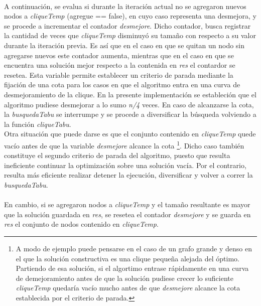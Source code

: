 \paragraph{}
A continuación, se evalua si durante la iteración actual no se agregaron nuevos nodos a \textit{cliqueTemp} (agregue == false), en cuyo caso representa una desmejora, y se procede a incrementar el contador \textit{desmejore}. Dicho contador, busca registrar la cantidad de veces que \textit{cliqueTemp} disminuyó su tamaño con respecto a su valor durante la iteración previa. Es así que en el caso en que se quitan un nodo sin agregarse nuevos este contador aumenta, mientras que en el caso en que se encuentra una solución mejor respecto a la contenida en \textit{res} el contardor se resetea. Esta variable permite establecer un criterio de parada mediante la fijación de una cota para los casos en que el algoritmo entra en una curva de desmejoramiento de la clique. En la presente implementación se estableción que el algoritmo pudiese desmejorar a lo sumo \textit{n/4} veces. En caso de alcanzarse la cota, la \textit{busquedaTabu} se interrumpe y se procede a diversificar la búsqueda volviendo a la función \textit{cliqueTabu}. \\
Otra situación que puede darse es que el conjunto contenido en \textit{cliqueTemp} quede vacío antes de que la variable \textit{desmejore} alcance la cota \footnote{A modo de ejemplo puede pensarse en el caso de un grafo grande y denso en el que la solución constructiva es una clique pequeña alejada del óptimo. Partiendo de esa solución, si el algortimo entrase rápidamente en una curva de demejoramiento antes de que la solución pudiese crecer lo suficiente \textit{cliqueTemp} quedaría vacío mucho antes de que \textit{desmejore} alcance la cota establecida por el criterio de parada.}. Dicho caso también constituye el segundo criterio de parada del algoritmo, puesto que resulta ineficiente continuar la optimización sobre una solución vacía. Por el contrario, resulta más eficiente realizar detener la ejecución, diversificar y volver a correr la \textit{busquedaTabu}.\\

\paragraph{}
En cambio, si se agregaron nodos a \textit{cliqueTemp} y el tamaño resultante es mayor que la solución guardada en \textit{res}, se resetea el contador \textit{desmejore} y se guarda en \textit{res} el conjunto de nodos contenido en \textit{cliqueTemp}.

